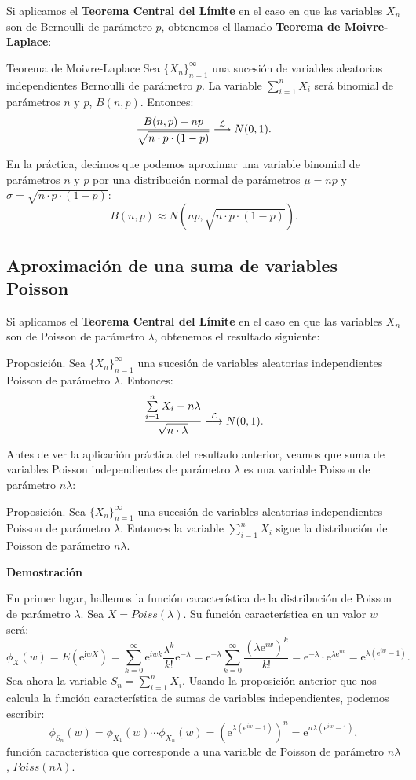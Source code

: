 \documentclass[]{book}
\begin{document}
Si aplicamos el \textbf{Teorema Central del Límite} en el caso en que las variables \(X_n\) son de Bernoulli de parámetro \(p\), obtenemos el llamado \textbf{Teorema de Moivre-Laplace}:

 Teorema de Moivre-Laplace
Sea \(\{X_n\}_{n=1}^\infty\) una sucesión de variables aleatorias independientes Bernoulli de parámetro \(p\). La variable \(\sum\limits_{i=1}^n X_i\) será binomial de parámetros \(n\) y \(p\), \(B(n,p)\). Entonces:
\[
\frac{B(n,p)-np}{\sqrt{n\cdot p\cdot (1-p)}}\stackrel{{\cal L}}{\longrightarrow} N(0,1).
\]

En la práctica, decimos que podemos aproximar una variable binomial de parámetros \(n\) y \(p\) por una distribución normal de parámetros \(\mu=np\) y \(\sigma =\sqrt{n\cdot p\cdot (1-p)}\):
\[
B(n,p)\approx N(np,\sqrt{n\cdot p\cdot (1-p)}).
\]

\hypertarget{aproximaciuxf3n-de-una-suma-de-variables-poisson}{%
\subsection{Aproximación de una suma de variables Poisson}\label{aproximaciuxf3n-de-una-suma-de-variables-poisson}}

Si aplicamos el \textbf{Teorema Central del Límite} en el caso en que las variables \(X_n\) son de Poisson de parámetro \(\lambda\), obtenemos el resultado siguiente:

 Proposición.
Sea \(\{X_n\}_{n=1}^\infty\) una sucesión de variables aleatorias independientes Poisson de parámetro \(\lambda\). Entonces:
\[
\frac{\sum\limits_{i=1}^n X_i -n\lambda}{\sqrt{n\cdot \lambda}}\stackrel{{\cal L}}{\longrightarrow} N(0,1).
\]

Antes de ver la aplicación práctica del resultado anterior, veamos que suma de variables Poisson independientes de parámetro \(\lambda\) es una variable Poisson de parámetro \(n\lambda\):

 Proposición.
Sea \(\{X_n\}_{n=1}^\infty\) una sucesión de variables aleatorias independientes Poisson de parámetro \(\lambda\). Entonces la variable \(\sum\limits_{i=1}^n X_i\) sigue la distribución de Poisson de parámetro \(n\lambda\).

\textbf{Demostración}

En primer lugar, hallemos la función característica de la distribución de Poisson de parámetro \(\lambda\). Sea \(X=Poiss(\lambda)\). Su función característica en un valor \(w\) será:
\[
\phi_X(w)=E\left(\mathrm{e}^{\mathrm{i} w X}\right)=\sum_{k=0}^\infty \mathrm{e}^{i w k}\frac{\lambda^k}{k!}\mathrm{e}^{-\lambda}=\mathrm{e}^{-\lambda} \sum_{k=0}^\infty \frac{\left(\lambda\mathrm{e}^{iw}\right)^k}{k!}=\mathrm{e}^{-\lambda}\cdot \mathrm{e}^{\lambda\mathrm{e}^{iw}}=\mathrm{e}^{\lambda \left(\mathrm{e}^{iw}-1\right)}.
\]
Sea ahora la variable \(S_n=\sum\limits_{i=1}^n X_i\). Usando la proposición anterior que nos calcula la función característica de sumas de variables independientes, podemos escribir:
\[
\phi_{S_n}(w)=\phi_{X_1}(w)\cdots \phi_{X_n}(w)=\left(\mathrm{e}^{\lambda \left(\mathrm{e}^{iw}-1\right)}\right)^n =\mathrm{e}^{n\lambda \left(\mathrm{e}^{iw}-1\right)},
\]
función característica que corresponde a una variable de Poisson de parámetro \(n\lambda\), \(Poiss(n\lambda)\).
\end{document}
